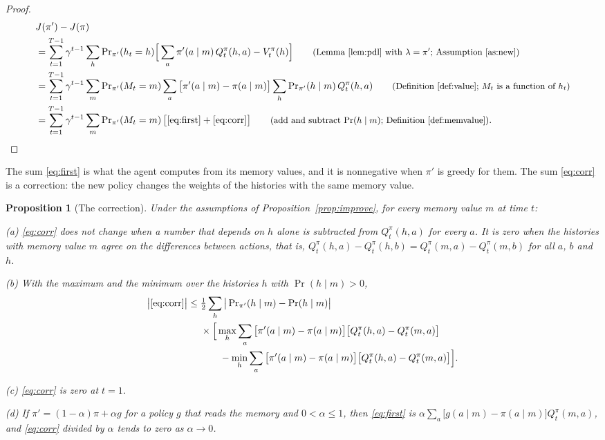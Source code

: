 \documentclass{article}
\newtheorem{proposition}{Proposition}[section]
\theoremstyle{definition}
\numberwithin{equation}{section}
\newcommand{\Prn}{\Pr\nolimits_{\pi'}}
\newcommand{\why}[1]{\tag*{\small(#1)}}
\begin{document}
\begin{proof}
\begin{align*}
&J(\pi')-J(\pi)\\
&=\sum_{t=1}^{T-1}\gamma^{t-1}\sum_h\Prn(h_t=h)\Big[\sum_a\pi'(a\mid m)\,Q^\pi_t(h,a)-V^\pi_t(h)\Big] \why{Lemma~\ref{lem:pdl} with $\lambda=\pi'$; Assumption~\ref{as:new}}\\
&=\sum_{t=1}^{T-1}\gamma^{t-1}\sum_m\Prn(M_t=m)\sum_a\big[\pi'(a\mid m)-\pi(a\mid m)\big]\sum_h\Prn(h\mid m)\,Q^\pi_t(h,a) \why{Definition~\ref{def:value}; $M_t$ is a function of $h_t$}\\
&=\sum_{t=1}^{T-1}\gamma^{t-1}\sum_m\Prn(M_t=m)\,\big[\eqref{eq:first}+\eqref{eq:corr}\big] \why{add and subtract $\Pr(h\mid m)$; Definition~\ref{def:memvalue}}.
\end{align*}
\end{proof}

The sum \eqref{eq:first} is what the agent computes from its memory values, and it is nonnegative when $\pi'$ is greedy for them. The sum \eqref{eq:corr} is a correction: the new policy changes the weights of the histories with the same memory value.

\begin{proposition}[The correction]\label{prop:corr}
Under the assumptions of Proposition~\ref{prop:improve}, for every memory value $m$ at time $t$:

(a) \eqref{eq:corr} does not change when a number that depends on $h$ alone is subtracted from $Q^\pi_t(h,a)$ for every $a$. It is zero when the histories with memory value $m$ agree on the differences between actions, that is, $Q^\pi_t(h,a)-Q^\pi_t(h,b)=Q^\pi_t(m,a)-Q^\pi_t(m,b)$ for all $a$, $b$ and $h$.

(b) With the maximum and the minimum over the histories $h$ with $\Pr(h\mid m)>0$,
\begin{align*}
\big|\eqref{eq:corr}\big|\le{}&\tfrac12\sum_h\big|\Prn(h\mid m)-\Pr(h\mid m)\big|\\
&\times\Big[\max_h\sum_a\big[\pi'(a\mid m)-\pi(a\mid m)\big]\big[Q^\pi_t(h,a)-Q^\pi_t(m,a)\big]\\
&\qquad-\min_h\sum_a\big[\pi'(a\mid m)-\pi(a\mid m)\big]\big[Q^\pi_t(h,a)-Q^\pi_t(m,a)\big]\Big].
\end{align*}

(c) \eqref{eq:corr} is zero at $t=1$.

(d) If $\pi'=(1-\alpha)\pi+\alpha g$ for a policy $g$ that reads the memory and $0<\alpha\le1$, then \eqref{eq:first} is $\alpha\sum_a\big[g(a\mid m)-\pi(a\mid m)\big]Q^\pi_t(m,a)$, and \eqref{eq:corr} divided by $\alpha$ tends to zero as $\alpha\to0$.
\end{proposition}
\end{document}
